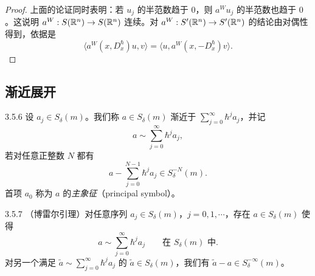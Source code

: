\begin{proof}
  上面的论证同时表明：若 \(u_j\) 的半范数趋于 \(0\)，则 \(a^Wu_j\) 的半范数也趋于 \(0\)。这说明 \(a^W:S(\mathbb{R}^n)\to S(\mathbb{R}^n)\) 连续。对 \(a^W:S'(\mathbb{R}^n)\to S'(\mathbb{R}^n)\) 的结论由对偶性得到，依据是
  \[
    \langle a^W(x,D_x^\hbar)u,v\rangle
    =\langle u,a^W(x,-D_x^\hbar)v\rangle.
  \]
\end{proof}

\subsection{渐近展开}

\begin{definition}{3.5.6}
  设 \(a_j\in S_\delta(m)\)。我们称 \(a\in S_\delta(m)\) 渐近于
  \(\sum_{j=0}^{\infty}\hbar^{j}a_j\)，并记
  \[
    a\sim\sum_{j=0}^{\infty}\hbar^{j}a_j,
  \]
  若对任意正整数 \(N\) 都有
  \[
    a-\sum_{j=0}^{N-1}\hbar^{j}a_j\in S_\delta^{-N}(m).
  \]
  首项 \(a_0\) 称为 \(a\) 的\emph{主象征}（principal symbol）。
\end{definition}

\begin{theorem}{3.5.7}
  （博雷尔引理）对任意序列 \(a_j\in S_\delta(m)\)，\(j=0,1,\cdots\)，存在 \(a\in S_\delta(m)\) 使得
  \[
    a\sim\sum_{j=0}^{\infty}\hbar^{j}a_j
    \qquad\text{在 }S_\delta(m)\text{ 中}.
  \]
  对另一个满足 \(\tilde a\sim\sum_{j=0}^{\infty}\hbar^{j}a_j\) 的 \(\tilde a\in S_\delta(m)\)，我们有 \(\tilde a-a\in S_\delta^{-\infty}(m)\)。
\end{theorem}

